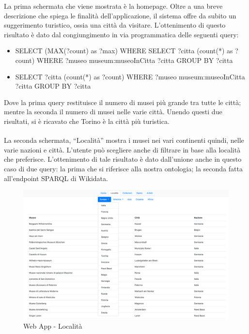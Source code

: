 \documentclass[12pt]{article}
\begin{document}
La prima schermata che viene mostrata è la homepage. Oltre a una breve descrizione che spiega le finalità dell’applicazione, il sistema offre da subito un suggerimento turistico, ossia una città da visitare.
L’ottenimento di questo risultato è dato dal congiungimento in via programmatica delle seguenti query:

\begin{itemize}
 \item SELECT (MAX(?count) as ?max) WHERE{ SELECT ?citta (count(*) as ?count) WHERE { ?museo museum:museoInCitta ?citta} GROUP BY ?citta}
 \item SELECT ?citta (count(*) as ?count) WHERE { ?museo museum:museoInCitta ?citta} GROUP BY ?citta
\end{itemize} 

Dove la prima query restituisce il numero di musei più grande tra tutte le città; mentre la seconda il numero di musei nelle varie città. Unendo questi due risultati, si è ricavato che Torino è la città più turistica. 
\\
\\
La seconda schermata, “Località” mostra i musei nei vari continenti quindi, nelle varie nazioni e città. L’utente può scegliere anche di filtrare in base alla località che preferisce. L’ottenimento di tale risultato è dato dall’unione anche in questo caso di due query: la prima che si riferisce alla nostra ontologia; la seconda fatta all’endpoint SPARQL di Wikidata.

\begin{figure}[!h]
   \centering
   \includegraphics[scale=0.30]{fig/Schermata 2 webapp.png}
   \caption{Web App - Località}\label{fig:picture}
\end{figure}
\end{document}
